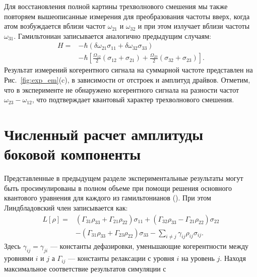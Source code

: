 Для восстановления полной картины трехволнового смешения мы также повторяем вышеописанные измерения для преобразования частоты вверх, когда атом возбуждается вблизи частот $\omega_{21}$ и $\omega_{32}$ и при этом излучает вблизи частоты $\omega_{31}$. Гамильтониан записывается аналогично предыдущим случаям: 
\begin{equation}
	\begin{aligned}
		H={}&-\hbar(\delta\omega_{21}\sigma_{11}+\delta\omega_{32}\sigma_{33})\\
		&-\hbar\left[\frac{\Omega_{12}}{2}(\sigma_{12}+\sigma_{21})+\frac{\Omega_{23}}{2}(\sigma_{32}+\sigma_{23})\right].
	\end{aligned}
\label{H3}
\end{equation}
Результат измерений когерентного сигнала на суммарной частоте представлен на Рис.~\ref{fig:exp_em}(c), в зависимости от отстроек и амплитуд драйвов. Отметим, что в эксперименте не обнаружено когерентного сигнала на разности частот $\omega_{23}-\omega_{12}$, что подтверждает квантовый характер трехволнового смешения. 
\section{Численный расчет амплитуды боковой компоненты}

Представленные в предыдущем разделе экспериментальные результаты могут быть просимулированы в полном объеме при помощи решения основного квантового уравнения для каждого из гамильтонианов (). При этом Линдбладовский член записывается как:
\begin{equation}
	\begin{aligned}
		L[\rho]={}&(\Gamma_{31}\rho_{33}+\Gamma_{21}\rho_{22})\sigma_{11}+(\Gamma_{32}\rho_{33}-\Gamma_{21}\rho_{22})\sigma_{22}\\
		&-(\Gamma_{31}\rho_{33}+\Gamma_{23}\rho_{22})\sigma_{33}-\sum_{i\neq j} \gamma_{ij}\rho_{ij}\sigma_{ij}.
	\end{aligned}
\end{equation}
Здесь $\gamma_{ij}=\gamma_{ji}$ --- константы дефазировки, уменьшающие когерентности между уровнями $i$ и $j$ а $\Gamma_{ij}$ --- константы релаксации с уровня $i$ на уровень $j$. Находя максимальное соответствие результатов симуляции с 
